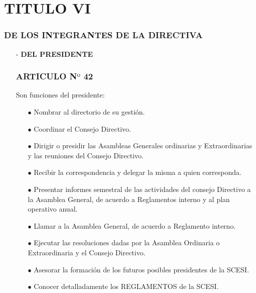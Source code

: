 \documentclass[11pt,letterpaper]{book}
\begin{document}
\section*{TITULO VI}
\subsubsection*{DE LOS INTEGRANTES DE LA DIRECTIVA}
\begin{itemize}
\item[-] {\bf DEL PRESIDENTE}
\subsubsection*{ARTICULO N$º$ 42}
Son funciones del presidente:
\begin{itemize}
\item[$\bullet$] Nombrar al directorio de su gestión.
\item[$\bullet$] Coordinar el Consejo Directivo.
\item[$\bullet$] Dirigir o presidir las Asambleas Generales ordinarias y Extraordinarias y las reuniones del Consejo Directivo. 
\item[$\bullet$] Recibir la correspondencia  y delegar la misma a quien corresponda.
\item[$\bullet$] Presentar informes semestral de las actividades del consejo Directivo a la Asamblea General, de acuerdo a Reglamentos interno y al plan operativo anual. 
\item[$\bullet$] Llamar a la Asamblea General, de acuerdo a Reglamento interno. 
\item[$\bullet$] Ejecutar las resoluciones dadas por la Asamblea Ordinaria o Extraordinaria y el Consejo Directivo. 
\item[$\bullet$] Asesorar la formación de los futuros posibles presidentes de la SCESI.
\item[$\bullet$] Conocer detalladamente los REGLAMENTOS de la SCESI.
\end{itemize}

\end{itemize}
\end{document}
